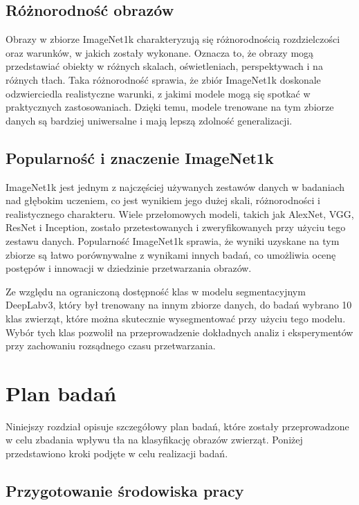 \subsection*{Różnorodność obrazów}

Obrazy w zbiorze ImageNet1k charakteryzują się różnorodnością rozdzielczości oraz warunków, w jakich zostały wykonane. 
Oznacza to, że obrazy mogą przedstawiać obiekty w różnych skalach, oświetleniach, perspektywach i na różnych tłach. 
Taka różnorodność sprawia, że zbiór ImageNet1k doskonale odzwierciedla realistyczne warunki, z jakimi modele mogą się 
spotkać w praktycznych zastosowaniach. Dzięki temu, modele trenowane na tym zbiorze danych są bardziej uniwersalne i 
mają lepszą zdolność generalizacji. 

\subsection*{Popularność i znaczenie ImageNet1k}

ImageNet1k jest jednym z najczęściej używanych zestawów danych w badaniach nad głębokim uczeniem, co jest wynikiem 
jego dużej skali, różnorodności i realistycznego charakteru. Wiele przełomowych modeli, takich jak AlexNet, VGG, 
ResNet i Inception, zostało przetestowanych i zweryfikowanych przy użyciu tego zestawu danych. Popularność ImageNet1k 
sprawia, że wyniki uzyskane na tym zbiorze są łatwo porównywalne z wynikami innych badań, co umożliwia ocenę postępów i 
innowacji w dziedzinie przetwarzania obrazów.

Ze względu na ograniczoną dostępność klas w modelu segmentacyjnym DeepLabv3,
który był trenowany na innym zbiorze danych, do badań wybrano 10 klas zwierząt, które można skutecznie wysegmentować 
przy użyciu tego modelu. Wybór tych klas pozwolił na przeprowadzenie dokładnych analiz i eksperymentów przy zachowaniu 
rozsądnego czasu przetwarzania.


\section*{Plan badań}

Niniejszy rozdział opisuje szczegółowy plan badań, które zostały przeprowadzone w celu zbadania wpływu tła na 
klasyfikację obrazów zwierząt. Poniżej przedstawiono kroki podjęte w celu realizacji 
badań.

\subsection*{Przygotowanie środowiska pracy}

